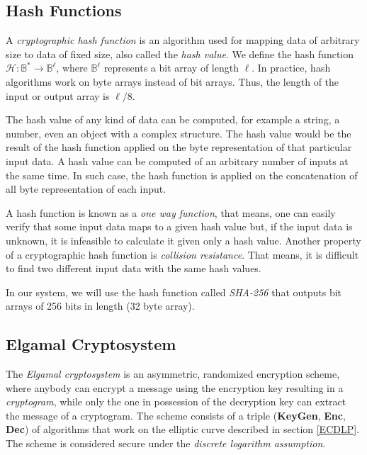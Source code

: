 
\subsection{Hash Functions}
A \textit{cryptographic hash function} is an algorithm used for mapping data of arbitrary size to data of fixed size, also called the \textit{hash value}. We define the hash function \( \mathcal{H} : \mathbb{B}^* \rightarrow \mathbb{B}^\ell \), where $\mathbb{B}^\ell$ represents a bit array of length $\ell$. In practice, hash algorithms work on byte arrays instead of bit arrays. Thus, the length of the input or output array is \( \ell/8 \).

The hash value of any kind of data can be computed, for example a string, a number, even an object with a complex structure. The hash value would be the result of the hash function applied on the byte representation of that particular input data. A hash value can be computed of an arbitrary number of inputs at the same time. In such case, the hash function is applied on the concatenation of all byte representation of each input.

A hash function is known as a \textit{one way function}, that means, one can easily verify that some input data maps to a given hash value but, if the input data is unknown, it is infeasible to calculate it given only a hash value. Another property of a cryptographic hash function is \textit{collision resistance}. That means, it is difficult to find two different input data with the same hash values.

In our system, we will use the hash function called \textit{SHA-256} that outputs bit arrays of 256 bits in length (32 byte array).

\subsection{Elgamal Cryptosystem}
The \textit{Elgamal cryptosystem} is an asymmetric, randomized encryption scheme, where anybody can encrypt a message using the encryption key resulting in a \textit{cryptogram}, while only the one in possession of the decryption key can extract the message of a cryptogram. The scheme consists of a triple (\textbf{KeyGen}, \textbf{Enc}, \textbf{Dec}) of algorithms that work on the elliptic curve described in section \ref{ECDLP}. The scheme is considered secure under the \textit{discrete logarithm assumption}.

